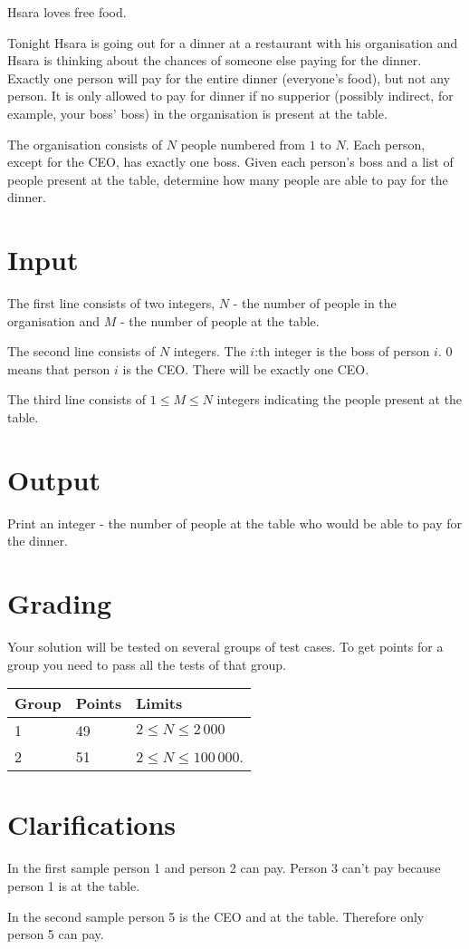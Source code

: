 
Hsara loves free food.

Tonight Hsara is going out for a dinner at a restaurant with his organisation and Hsara is thinking about the chances of someone else paying for the dinner. Exactly one person will pay for the entire dinner (everyone's food), but not any person. It is only allowed to pay for dinner if no supperior (possibly indirect, for example, your boss' boss) in the organisation is present at the table.

The organisation consists of $N$ people numbered from $1$ to $N$. Each person, except for the CEO, has exactly one boss. Given each person's boss and a list of people present at the table, determine how many people are able to pay for the dinner.

\section*{Input}

The first line consists of two integers, $N$ - the number of people in the organisation and $M$ - the number of people at the table.

The second line consists of $N$ integers. The $i$:th integer is the boss of person $i$. 0 means that person $i$ is the CEO. There will be exactly one CEO.

The third line consists of $1 \le M \le N$ integers indicating the people present at the table.

\section*{Output}
Print an integer - the number of people at the table who would be able to pay for the dinner.

\section*{Grading}
Your solution will be tested on several groups of test cases. To get points for a group you need to pass all the tests of that group.

\begin{tabular}{| l | l | l |}
	\hline
	Group & Points & Limits\\ \hline
  1     & 49         & $2 \le N \le 2\,000$ \\ \hline
  2     & 51         & $2 \le N \le 100\,000$. \\ \hline
\end{tabular}

\section*{Clarifications}
In the first sample person 1 and person 2 can pay. Person 3 can't pay because person 1 is at the table.

In the second sample person 5 is the CEO and at the table. Therefore only person 5 can pay.
